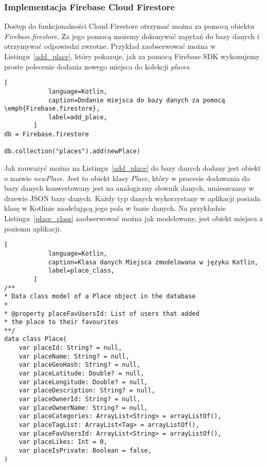         \subsubsection{Implementacja Firebase Cloud Firestore}
        Dostęp do funkcjonalności Cloud Firestore otrzymać można za pomocą obiektu \emph{Firebase.firestore}. Za jego pomocą możemy dokonywać zapytań do bazy danych i otrzymywać odpowiedzi zwrotne.
        Przykład zaobserwować można w Listingu~\ref{add_place}, który pokazuje, jak za pomocą Firebase SDK wykonujemy proste polecenie dodania nowego miejsca do kolekcji \emph{places}.

        \vspace{1cm}
        \begin{lstlisting}[
            language=Kotlin, 
            caption=Dodanie miejsca do bazy danych za pomocą \emph{Firebase.firestore}, 
            label=add_place,
        ]
db = Firebase.firestore

db.collection("places").add(newPlace)
        \end{lstlisting}
        \vspace{1cm}

        Jak zauważyć można na Listingu~\ref{add_place} do bazy danych dodany jest obiekt o nazwie \emph{newPlace}. Jest to obiekt klasy \emph{Place}, który w procesie dodawania do bazy danych konwertowany jest
        na analogiczny słownik danych, umieszczany w drzewie JSON bazy danych. Każdy typ danych wykorzystany w aplikacji posiada klasę w Kotlinie modelującą jego pola w bazie danych. Na przykładzie 
        Listingu~\ref{place_class} zaobserwować można jak modelowany, jest obiekt miejsca z poziomu aplikacji.

        \vspace{1cm}
        \begin{lstlisting}[
            language=Kotlin, 
            caption=Klasa danych Miejsca zmodelowana w języku Kotlin, 
            label=place_class,
        ]
/**
* Data class model of a Place object in the database
*
* @property placeFavUsersId: List of users that added 
* the place to their favourites
**/
data class Place(
    var placeId: String? = null,
    var placeName: String? = null,
    var placeGeoHash: String? = null,
    var placeLatitude: Double? = null,
    var placeLongitude: Double? = null,
    var placeDescription: String? = null,
    var placeOwnerId: String? = null,
    var placeOwnerName: String? = null,
    var placeCategories: ArrayList<String> = arrayListOf(),
    var placeTagList: ArrayList<Tag> = arrayListOf(),
    var placeFavUsersId: ArrayList<String> = arrayListOf(),
    var placeLikes: Int = 0,
    var placeIsPrivate: Boolean = false,
)
        \end{lstlisting}
        \vspace{1cm}

